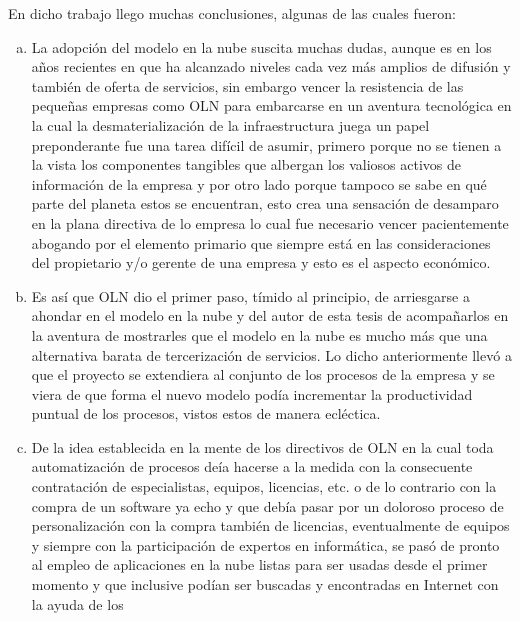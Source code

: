 En dicho trabajo llego muchas conclusiones, algunas de las cuales fueron:
\begin{enumerate}[a.]
    \item La adopci\'on del modelo en la nube suscita muchas dudas, aunque es en
          los a\~nos recientes en que ha alcanzado niveles cada vez m\'as amplios
          de difusi\'on y tambi\'en de oferta de servicios, sin embargo vencer la
          resistencia de las peque\~nas empresas como OLN para embarcarse en un
          aventura tecnol\'ogica en la cual la desmaterializaci\'on de la
          infraestructura juega un papel preponderante fue una tarea dif\'icil
          de asumir, primero porque no se tienen a la vista los componentes
          tangibles que albergan los valiosos activos de informaci\'on de la
          empresa y por otro lado porque tampoco se sabe en qu\'e parte del
          planeta estos se encuentran, esto crea una sensaci\'on de desamparo en
          la plana directiva de lo empresa lo cual fue necesario vencer
          pacientemente abogando por el elemento primario que siempre est\'a en
          las consideraciones del propietario y/o gerente de una empresa y esto
          es el aspecto econ\'omico.
    \item Es as\'i que OLN dio el primer paso, t\'imido al principio, de arriesgarse
          a ahondar en el modelo en la nube y del autor de esta tesis de acompa\~narlos
          en la aventura de mostrarles que el modelo en la nube es mucho m\'as
          que una alternativa barata de tercerizaci\'on de servicios. Lo dicho
          anteriormente llev\'o a que el proyecto se extendiera al conjunto de
          los procesos de la empresa y se viera de que forma el nuevo modelo
          pod\'ia incrementar la productividad puntual de los procesos, vistos
          estos de manera ecl\'ectica.
    \item De la idea establecida en la mente de los directivos de OLN en la cual
          toda automatizaci\'on de procesos de\'ia hacerse a la medida con la
          consecuente contrataci\'on de especialistas, equipos, licencias, etc.
          o de lo contrario con la compra de un software ya echo y que deb\'ia
          pasar por un doloroso proceso de personalizaci\'on con la compra tambi\'en
          de licencias, eventualmente de equipos y siempre con la participaci\'on
          de expertos en inform\'atica, se pas\'o de pronto al empleo de aplicaciones
          en la nube listas para ser usadas desde el primer momento y que inclusive
          pod\'ian ser buscadas y encontradas en Internet con la ayuda de los

\end{enumerate}
